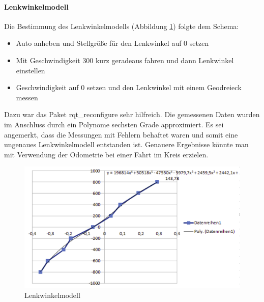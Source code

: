 \paragraph{Lenkwinkelmodell}
Die Bestimmung des Lenkwinkelmodells (Abbildung \ref{fig:steering_profile}) folgte dem Schema:
\begin{itemize}
	\item Auto anheben und Stellgr\"o\ss{}e f\"ur den Lenkwinkel auf 0 setzen
	\item Mit Geschwindigkeit 300 kurz geradeaus fahren und dann Lenkwinkel einstellen
	\item Geschwindigkeit auf 0 setzen und den Lenkwinkel mit einem Geodreieck messen
\end{itemize}
Dazu war das Paket rqt\_reconfigure sehr hilfreich. Die gemessenen Daten wurden im Anschluss durch ein Polynome sechsten Grade approximiert. Es sei angemerkt, dass die Messungen mit Fehlern behaftet waren und somit eine ungenaues Lenkwinkelmodell entstanden ist. Genauere Ergebnisse k\"onnte man mit Verwendung der Odometrie bei einer Fahrt im Kreis erzielen.
\begin{figure}[h] %
	\centering
	\includegraphics[width=0.7\linewidth]{pics/steering_profile}
	\caption{Lenkwinkelmodell}
	\label{fig:steering_profile}
\end{figure}